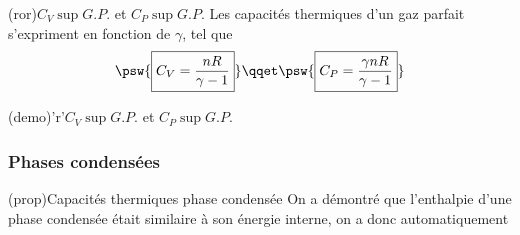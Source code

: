 \documentclass[../../main/main.tex]{subfiles}
\begin{document}
\begin{tcbraster}[raster equal height=rows, raster columns=2]
	\begin{tcb*}[%
		list entry={\hspace*{-20pt}\protect\rcheck~~{Expressions de $C_V\sup{G.P.}$
		et $C_P\sup{G.P.}$}}%
		](ror){$C_V\sup{G.P.}$ et $C_P\sup{G.P.}$}
		Les capacités thermiques d'un gaz parfait s'expriment en fonction de $\gamma$,
		tel que
		\[
			\psw{\boxed{C_V = \frac{nR}{\gamma-1}}}
			\qqet
			\psw{\boxed{C_P = \frac{\gamma nR}{\gamma-1}}}
		\]
	\end{tcb*}
	\begin{tcb*}[%
		list entry={\hspace*{-20pt}\protect\rcheck~~{Expressions de $C_V\sup{G.P.}$
		et $C_P\sup{G.P.}$}}%
		](demo)'r'{$C_V\sup{G.P.}$ et $C_P\sup{G.P.}$}
	\end{tcb*}
\end{tcbraster}

\subsubsection{Phases condensées}
\begin{tcb*}[%
		list entry={\hspace*{-20pt}\protect\rcheck~~Capacités thermiques phase cond.}%
	](prop){Capacités thermiques phase condensée}
	On a démontré que l'enthalpie d'une phase condensée était similaire à son
	énergie interne, on a donc automatiquement
	\psw{%
		\[
			\boxed{C_P \approx C_V = C = \cte}
		\]
	}%
\end{tcb*}
\end{document}

